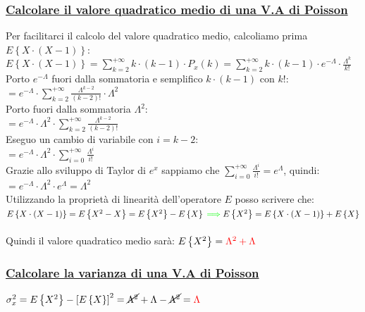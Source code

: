 \documentclass{article}
\begin{document}
\subsubsection{\underline{Calcolare il valore quadratico medio di una V.A di Poisson}}
Per facilitarci il calcolo del valore quadratico medio, calcoliamo prima $E \left\{X \cdot \left( X-1 \right) \right\}$: \\
$E \left\{X \cdot \left( X-1 \right) \right\} = \sum_{k=2}^{+\infty} k \cdot (k-1) \cdot P_x(k) = \sum_{k=2}^{+\infty} k \cdot (k-1) \cdot e^{-\Lambda} \cdot \frac{\Lambda^k}{k!}$ \\
Porto $e^{-\Lambda}$ fuori dalla sommatoria e semplifico $k \cdot (k-1)$ con $k!$: \\
$= e^{-\Lambda} \cdot \sum_{k=2}^{+\infty} \frac{\Lambda^{k-2}}{(k-2)!} \cdot \Lambda^2$ \\
Porto fuori dalla sommatoria $\Lambda^2$: \\
$= e^{-\Lambda} \cdot  \Lambda^2 \cdot \sum_{k=2}^{+\infty} \frac{\Lambda^{k-2}}{(k-2)!}$ \\
Eseguo un cambio di variabile con $i = k-2$: \\
$= e^{-\Lambda} \cdot  \Lambda^2 \cdot \sum_{i=0}^{+\infty} \frac{\Lambda^{i}}{i!}$ \\
Grazie allo sviluppo di Taylor di $e^x$ sappiamo che $\sum_{i=0}^{+\infty} \frac{\Lambda^i}{i!} = e^\Lambda$, quindi: \\
$= e^{-\Lambda} \cdot  \Lambda^2 \cdot e^\Lambda = \Lambda^2$ \\
Utilizzando la proprietà di linearità dell’operatore $E$ posso scrivere che: \\
$E\left\{X\cdot(X-1)\right\} = E\left\{X^2 - X\right\} = E \left\{X^2\right\} - E\left\{X\right\} {\color{green}\implies} E\left\{X^2\right\} = E\left\{X\cdot(X-1)\right\}  + E\left\{X\right\}$ \\ \\
Quindi il valore quadratico medio sarà: $E\left\{X^2\right\} = \color{red} \Lambda^2 + \Lambda$
\subsubsection{\underline{Calcolare la varianza di una V.A di Poisson}}
$\sigma_x^2 = E\left\{X^2\right\} - \left[E\left\{X\right\}\right]^2 = \cancel{\Lambda^2} + \Lambda - \cancel{\Lambda^2} = \color{red} \Lambda$
\end{document}
